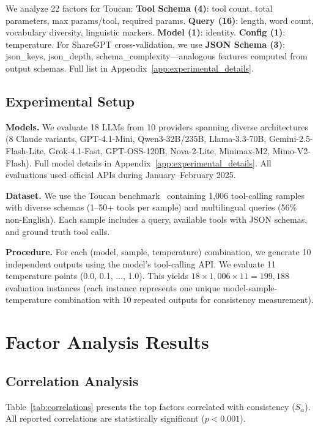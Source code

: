 \documentclass[sigconf,anonymous,review]{acmart}
\begin{document}
We analyze 22 factors for Toucan: \textbf{Tool Schema (4)}: tool count, total parameters, max params/tool, required params. \textbf{Query (16)}: length, word count, vocabulary diversity, linguistic markers. \textbf{Model (1)}: identity. \textbf{Config (1)}: temperature. For ShareGPT cross-validation, we use \textbf{JSON Schema (3)}: json\_keys, json\_depth, schema\_complexity---analogous features computed from output schemas. Full list in Appendix~\ref{app:experimental_details}.

\subsection{Experimental Setup}

\textbf{Models.} We evaluate 18 LLMs from 10 providers spanning diverse architectures (8 Claude variants, GPT-4.1-Mini, Qwen3-32B/235B, Llama-3.3-70B, Gemini-2.5-Flash-Lite, Grok-4.1-Fast, GPT-OSS-120B, Nova-2-Lite, Minimax-M2, Mimo-V2-Flash). Full model details in Appendix~\ref{app:experimental_details}. All evaluations used official APIs during January--February 2025.

\textbf{Dataset.} We use the Toucan benchmark~\cite{toucan2025} containing 1,006 tool-calling samples with diverse schemas (1--50+ tools per sample) and multilingual queries (56\% non-English). Each sample includes a query, available tools with JSON schemas, and ground truth tool calls.

\textbf{Procedure.} For each (model, sample, temperature) combination, we generate 10 independent outputs using the model's tool-calling API. We evaluate 11 temperature points (0.0, 0.1, ..., 1.0). This yields $18 \times 1{,}006 \times 11 = 199{,}188$ evaluation instances (each instance represents one unique model-sample-temperature combination with 10 repeated outputs for consistency measurement).

\section{Factor Analysis Results}
\label{sec:results}

\subsection{Correlation Analysis}

Table~\ref{tab:correlations} presents the top factors correlated with consistency ($S_\alpha$). All reported correlations are statistically significant ($p < 0.001$).
\end{document}
